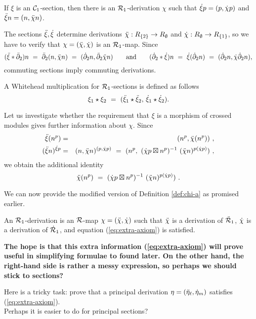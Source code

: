 \begin{lem}
If $\xi$ is an $\mathcal{C}_1$-section, then there is an $\mathcal{R}_1$-derivation $\chi$
such that $\dot{\xi} p = (p, \dot{\chi} p)$  and  $\ddot{\xi} n = (n, \ddot{\chi} n)$.
\end{lem}
\begin{pf}
The sections $\ddot{\xi}, \dot{\xi}$ determine derivations 
$\ddot{\chi} : R_{\{2\}} \to R_{\emptyset}$ and 
$\dot{\chi} : R_{\emptyset} \to R_{\{1\}}$, so we have to verify
that $\chi = (\ddot{\chi},\dot{\chi})$ is an $\mathcal{R}_1$-map.
Since
$$
(\ddot{\xi} * \bar{\partial}_2) n 
    ~=~  \bar{\partial}_2(n, \ddot{\chi} n) 
    ~=~ (\dot{\partial}_2 n, \ddot{\partial}_2 \ddot{\chi} n) 
\qquad\mbox{and}\qquad
(\dot{\partial}_2 * \dot{\xi}) n
    ~=~  \dot{\xi}(\dot{\partial}_2 n)
    ~=~(\dot{\partial}_2 n, \dot{\chi} \dot{\partial}_2 n),
$$
commuting sections imply commuting derivations.
\end{pf}

\begin{defn} 
A Whitehead multiplication for $\mathcal{R}_1$-sections is defined as follows 
$$
\xi_1 \star \xi_2 ~=~ ( \ddot{\xi}_1 \star \ddot{\xi}_2,\, \dot{\xi}_1 \star \dot{\xi}_2). 
$$ 
\end{defn}


\medskip
Let us investigate whether the requirement that $\xi$ is a morphism 
of crossed modules gives further information about $\chi$.
Since
\begin{eqnarray*}
\ddot{\xi}(n^p)
& = &  (n^p,\ddot{\chi}(n^p))~, \\
(\ddot{\xi} n)^{\dot{\xi} p}
& = &  (n, \ddot{\chi} n)^{(p, \dot{\chi} p)} 
~ = ~  (n^p,~(\dot{\chi} p \boxtimes n^p)^{-1}~(\ddot{\chi} n)^{p(\dot{\chi} p)})~,
\end{eqnarray*}
we obtain the additional identity
\begin{equation} \label{eq:extra-axiom}
\ddot{\chi}(n^p) ~=~ (\dot{\chi} p \boxtimes n^p)^{-1}~(\ddot{\chi} n)^{p(\dot{\chi} p)})~.
\end{equation}

We can now provide the modified version of Definition \ref{def:chi-a}
as promised earlier.

\begin{defn} \label{def:chi-b}
An $\mathcal{R}_1$-derivation is an $\mathcal{R}$-map $\chi = (\ddot{\chi}, \dot{\chi})$ 
such that $\ddot{\chi}$ is a derivation of $\ddot{\mathcal{R}}_1$, 
$\dot{\chi}$ is a derivation of $\dot{\mathcal{R}}_1$,
and equation (\ref{eq:extra-axiom}) is satisfied.
\end{defn}

\bigskip
{\bf The hope is that this extra information (\ref{eq:extra-axiom}) 
will prove useful in simplifying formulae to found later.
On the other hand, the right-hand side is rather a messy expression,
so perhaps we should stick to sections?

\medskip
Here is a tricky task: prove that a principal derivation
$\eta = (\ddot{\eta}_{\ell},\dot{\eta}_m)$ satisfies (\ref{eq:extra-axiom}).\\
Perhaps it is easier to do for principal sections?}


